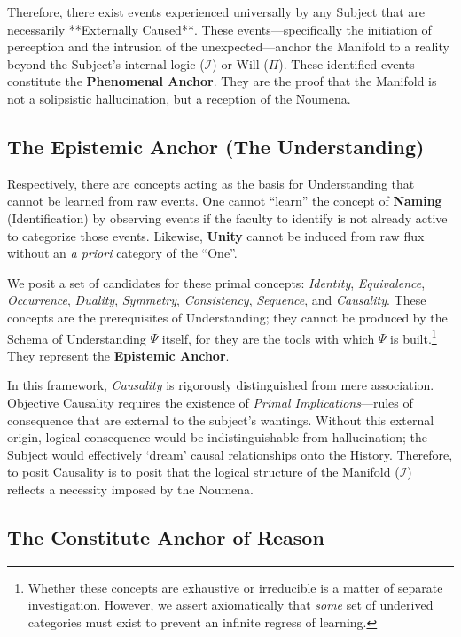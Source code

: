\documentclass[11pt, a4paper]{article}
\theoremstyle{formalism}
\begin{document}
{Therefore, there exist events experienced universally by any Subject that are
necessarily **Externally Caused**. These events—specifically the initiation of
perception and the intrusion of the unexpected—anchor the Manifold to a reality
beyond the Subject's internal logic ($\mathcal{I}$) or Will ($\Pi$). These
identified events constitute the \textbf{Phenomenal Anchor}. They are the proof
that the Manifold is not a solipsistic hallucination, but a reception of the
Noumena.

\subsection{The Epistemic Anchor (The Understanding)}

Respectively, there are concepts acting as the basis for Understanding that
cannot be learned from raw events. One cannot ``learn'' the concept of
\textbf{Naming} (Identification) by observing events if the faculty to identify
is not already active to categorize those events. Likewise, \textbf{Unity}
cannot be induced from raw flux without an \textit{a priori} category of the
``One''.

We posit a set of candidates for these primal concepts: \textit{Identity},
\textit{Equivalence}, \textit{Occurrence}, \textit{Duality}, \textit{Symmetry},
\textit{Consistency}, \textit{Sequence}, and \textit{Causality}. These concepts
are the prerequisites of Understanding; they cannot be produced by the Schema
of Understanding $\Psi$ itself, for they are the tools with which $\Psi$ is
built.\footnote{Whether these concepts are exhaustive or irreducible is a
matter of separate investigation. However, we assert axiomatically that
\textit{some} set of underived categories must exist to prevent an infinite
regress of learning.} They represent the \textbf{Epistemic Anchor}.

In this framework, \textit{Causality} is rigorously distinguished from mere
association. Objective Causality requires the existence of \textit{Primal
Implications}---rules of consequence that are external to the subject's wantings.
Without this external origin, logical consequence would be indistinguishable
from hallucination; the Subject would effectively `dream' causal relationships
onto the History. Therefore, to posit Causality is to posit that the logical
structure of the Manifold ($\mathcal{I}$) reflects a necessity imposed by the
Noumena.

\subsection{The Constitute Anchor of Reason}

}
\end{document}
